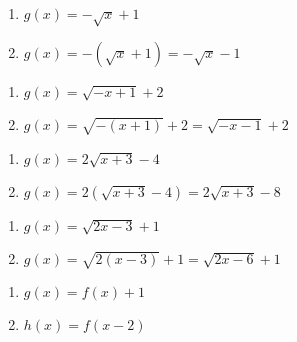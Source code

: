 \documentclass{ximera}
\begin{document}
\begin{multicols}{2}
\begin{enumerate}
\setcounter{enumi}{\value{HW}}

\item  $g(x) = -\sqrt{x} + 1$
\item  $g(x) = -(\sqrt{x} + 1) = -\sqrt{x} - 1$

\setcounter{HW}{\value{enumi}}
\end{enumerate}
\end{multicols}

\begin{multicols}{2}
\begin{enumerate}
\setcounter{enumi}{\value{HW}}

\item  $g(x) = \sqrt{-x+1} + 2$
\item  $g(x) = \sqrt{-(x+1)} + 2 = \sqrt{-x-1} + 2$

\setcounter{HW}{\value{enumi}}
\end{enumerate}
\end{multicols}

\begin{multicols}{2}
\begin{enumerate}
\setcounter{enumi}{\value{HW}}

\item  $g(x) = 2\sqrt{x+3} - 4$
\item  $g(x) = 2\left(\sqrt{x+3} - 4\right) = 2\sqrt{x+3} - 8$

\setcounter{HW}{\value{enumi}}
\end{enumerate}
\end{multicols}

\begin{multicols}{2}
\begin{enumerate}
\setcounter{enumi}{\value{HW}}

\item  $g(x) = \sqrt{2x-3} + 1$
\item  $g(x) = \sqrt{2(x-3)} + 1 = \sqrt{2x-6}+1$

\setcounter{HW}{\value{enumi}}
\end{enumerate}
\end{multicols}

\begin{multicols}{2}
\begin{enumerate}
\setcounter{enumi}{\value{HW}}

\item  $g(x)=f(x)+1$ 

\item  $h(x) = f(x-2)$ 


\setcounter{HW}{\value{enumi}}
\end{enumerate}
\end{multicols}
\end{document}
